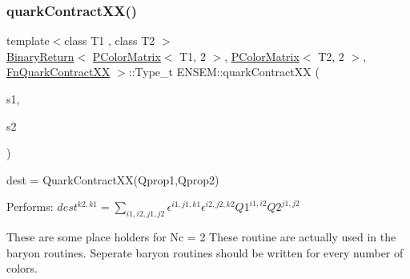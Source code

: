 \subsubsection{\texorpdfstring{quarkContractXX()}{quarkContractXX()}\hspace{0.1cm}{\footnotesize\ttfamily [3/4]}}
{\footnotesize\ttfamily template$<$class T1 , class T2 $>$ \\
\mbox{\hyperlink{structENSEM_1_1BinaryReturn}{Binary\+Return}}$<$ \mbox{\hyperlink{classENSEM_1_1PColorMatrix}{P\+Color\+Matrix}}$<$ T1, 2 $>$, \mbox{\hyperlink{classENSEM_1_1PColorMatrix}{P\+Color\+Matrix}}$<$ T2, 2 $>$, \mbox{\hyperlink{structENSEM_1_1FnQuarkContractXX}{Fn\+Quark\+Contract\+XX}} $>$\+::Type\+\_\+t E\+N\+S\+E\+M\+::quark\+Contract\+XX (\begin{DoxyParamCaption}\item[{const \mbox{\hyperlink{classENSEM_1_1PColorMatrix}{P\+Color\+Matrix}}$<$ T1, 2 $>$ \&}]{s1,  }\item[{const \mbox{\hyperlink{classENSEM_1_1PColorMatrix}{P\+Color\+Matrix}}$<$ T2, 2 $>$ \&}]{s2 }\end{DoxyParamCaption})\hspace{0.3cm}{\ttfamily [inline]}}



dest = Quark\+Contract\+X\+X(\+Qprop1,\+Qprop2) 

Performs\+: $dest^{k2,k1} = \sum_{i1,i2,j1,j2} \epsilon^{i1,j1,k1}\epsilon^{i2,j2,k2} Q1^{i1,i2} Q2^{j1,j2}$

These are some place holders for Nc = 2 These routine are actually used in the baryon routines. Seperate baryon routines should be written for every number of colors. \mbox{\label{group__primcolormatrix_ga8f56e6d4ff1d01fb47481eb16006efa7}} 
